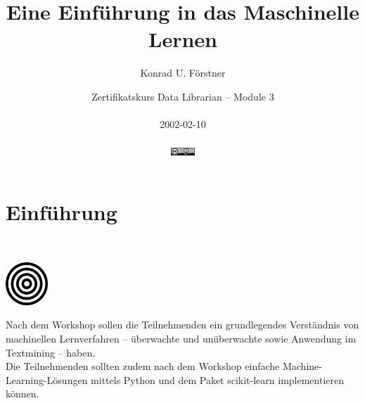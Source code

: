 \documentclass[aspectratio=169]{beamer}
\title{Eine Einführung in das Maschinelle Lernen}
\author{\small Konrad U. Förstner}
\institute{ZB MED -- Informationszentrum Lebenswissenschaften \& TH Köln}
\date{\scriptsize 
  Zertifikatskurs Data Librarian -- Module 3\\\ \\
  2002-02-10\\\ \\
  \href{https://creativecommons.org/licenses/by/4.0/}{\includegraphics[width=0.88cm]{images/creative_commons_attribute.png}}
}
\begin{document}

\begin{frame}{}
  \titlepage
\end{frame}

\logo{}


\setcounter{tocdepth}{1}
\begin{frame}{}
   \tableofcontents
\end{frame}

\section{Einführung}

\begin{frame}
  \begin{block}{}
    \vspace{0.5cm}
    \ \ \ \
    \begin{minipage}{0.10\textwidth}
      \begin{center}
        \includegraphics[width=1.6cm]{images/publicdomainvectors_target-plain.pdf}
      \end{center}        
    \end{minipage}
    \hfill
    \begin{minipage}{0.80\textwidth}
      Nach dem Workshop sollen die Teilnehmenden ein grundlegendes
      Verständnis von machinellen Lernverfahren -- überwachte und
      unüberwachte sowie Anwendung im Textmining -- haben.\\

      Die Teilnehmenden sollten zudem nach dem Workshop einfache
      Machine-Learning-Lösungen mittels Python und dem Paket
      scikit-learn implementieren können.
    \end{minipage}
    \vspace{0.3cm}
  \end{block}
\end{frame}

\begin{frame}{}
   \tableofcontents[currentsection]
\end{frame}
\end{document}
